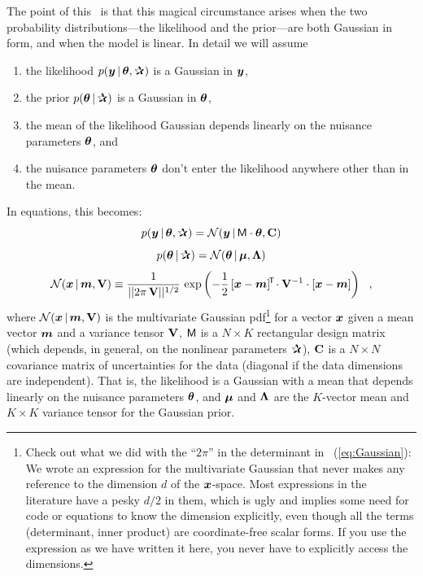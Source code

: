 The point of this \documentname\ is that this magical circumstance
arises when the two probability
distributions---the likelihood and the prior---are both Gaussian in
form, and when the model is linear.
In detail we will assume
\begin{enumerate}
\item
the likelihood $p(\vy\given\vtheta,\bP)$ is a Gaussian in $\boldsymbol{y}$,
\item
the prior $p(\vtheta\given\bP)$ is a Gaussian in $\boldsymbol{\theta}$,
\item
the mean of the likelihood Gaussian depends linearly on the nuisance
parameters $\boldsymbol{\theta}$, and
\item
the nuisance parameters $\boldsymbol{\theta}$ don't enter the likelihood anywhere
other than in the mean.
\end{enumerate}
In equations, this becomes:
\begin{equation}
p(\vy\given\vtheta,\bP) = \normal(\vy\given\mM\cdot\vtheta,\tC)
\end{equation}
\begin{equation}
p(\vtheta\given\bP) = \normal(\vtheta\given\vmu,\tLambda)
\end{equation}
\begin{equation}\label{eq:Gaussian}
\mathcal{N}\!\,(\boldsymbol{x}\,|\,\boldsymbol{m},\mathbf{V}) \equiv \frac{1}{||2\pi\,\mathbf{V}||^{1/2}}\,\exp\left(-\frac{1}{2}\,[\boldsymbol{x}-\boldsymbol{m}]^{\!\mathsf{T}\!} \cdot \mathbf{V}^{-1} \cdot [\boldsymbol{x} - \boldsymbol{m}]\right)
~~,
\end{equation}
where $\mathcal{N}\!\,(\boldsymbol{x}\,|\,\boldsymbol{m},\mathbf{V})$ is the multivariate Gaussian
pdf\footnote{Check out what we did with the ``$2\pi$'' in the determinant in
  \equationname~(\ref{eq:Gaussian}): We wrote an expression for the
  multivariate Gaussian that never makes any reference to the
  dimension $d$ of the $\boldsymbol{x}$-space. Most expressions in the literature
  have a pesky $d/2$ in them, which is ugly and implies some need for
  code or equations to know the dimension explicitly, even though all
  the terms (determinant, inner product) are coordinate-free scalar
  forms. If you use the expression as we have written it here, you never
  have to explicitly access the dimensions.} for a vector $\boldsymbol{x}$
given a mean vector $\boldsymbol{m}$ and a variance tensor $\mathbf{V}$,
$\mathsf{M}$ is a $N\times K$ rectangular design matrix (which depends, in
general, on the nonlinear parameters $\bP$),
$\mathbf{C}$ is a $N\times N$ covariance matrix of uncertainties for the
data (diagonal if the data dimensions are independent).
That is, the likelihood is a Gaussian with a mean that depends
linearly on the nuisance parameters $\boldsymbol{\theta}$, and
$\boldsymbol{\mu}$ and $\mathbf{\Lambda}$ are the $K$-vector mean and $K\times K$ variance tensor
for the Gaussian prior.

